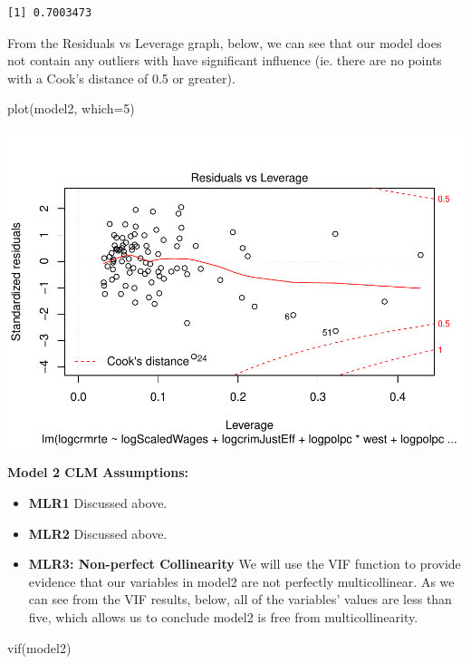 \documentclass[]{article}
\newenvironment{Shaded}{}{}
\newcommand{\DataTypeTok}[1]{#1}
\newcommand{\DecValTok}[1]{#1}
\newcommand{\KeywordTok}[1]{\textcolor[rgb]{0.00,0.00,1.00}{#1}}
\newcommand{\NormalTok}[1]{#1}
\begin{document}
\begin{verbatim}
[1] 0.7003473
\end{verbatim}

From the Residuals vs Leverage graph, below, we can see that our model
does not contain any outliers with have significant influence (ie. there
are no points with a Cook's distance of 0.5 or greater).

\begin{Shaded}
\begin{Highlighting}[]
\KeywordTok{plot}\NormalTok{(model2, }\DataTypeTok{which=}\DecValTok{5}\NormalTok{)}
\end{Highlighting}
\end{Shaded}

\includegraphics{Bagnard_Gaustad_Hartman_Leung_Lab_3_files/figure-latex/unnamed-chunk-70-1.pdf}

\textbf{Model 2 CLM Assumptions:}

\begin{itemize}
\item
  \textbf{MLR1} Discussed above.
\item
  \textbf{MLR2} Discussed above.
\item
  \textbf{MLR3: Non-perfect Collinearity} We will use the VIF function
  to provide evidence that our variables in model2 are not perfectly
  multicollinear. As we can see from the VIF results, below, all of the
  variables' values are less than five, which allows us to conclude
  model2 is free from multicollinearity.
\end{itemize}

\begin{Shaded}
\begin{Highlighting}[]
\KeywordTok{vif}\NormalTok{(model2)}
\end{Highlighting}
\end{Shaded}
\end{document}

